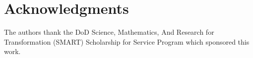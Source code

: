 \documentclass[conf]{new-aiaa}
\begin{document}
\section*{Acknowledgments}
The authors thank the DoD Science, Mathematics, And 
Research for Transformation (SMART) Scholarship
for Service Program which sponsored this work.



\end{document}
